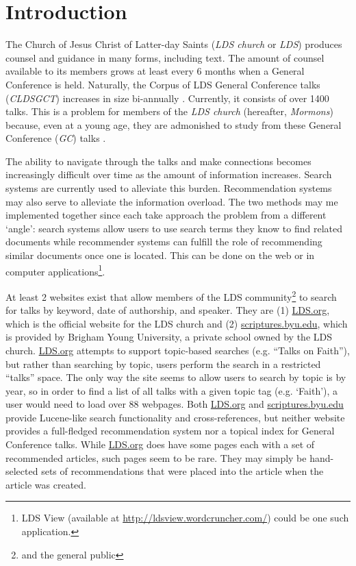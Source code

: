 \chapter{Introduction}

The Church of Jesus Christ of Latter-day Saints (\emph{LDS church} or \emph{LDS}) produces counsel and guidance in many forms, including text. The amount of counsel available to its members grows at least every 6 months when a General Conference is held. Naturally, the Corpus of LDS General Conference talks (\emph{CLDSGCT}) increases in size bi-annually \citep{davies:gc}. Currently, it consists of over 1400 talks. This is a problem for members of the \emph{LDS church} (hereafter, \emph{Mormons}) because, even at a young age, they are admonished to study from these General Conference (\emph{GC}) talks \citep{childrens_songbook}.

The ability to navigate through the talks and make connections becomes increasingly difficult over time as the amount of information increases. Search systems are currently used to alleviate this burden. Recommendation systems may also serve to alleviate the information overload. The two methods may me implemented together since each take approach the problem from a different `angle': search systems allow users to use search terms they know to find related documents while recommender systems can fulfill the role of recommending similar documents once one is located. This can be done on the web or in computer applications\footnote{LDS View (available at \url{http://ldsview.wordcruncher.com/}) could be one such application.}.

At least 2 websites exist that allow members of the LDS community\footnote{and the general public} to search for talks by keyword, date of authorship, and speaker. They are (1) \url{LDS.org}, which is the official website for the LDS church and (2) \url{scriptures.byu.edu}, which is provided by Brigham Young University, a private school owned by the LDS church. \url{LDS.org} attempts to support topic-based searches (e.g. ``Talks on Faith''), but rather than searching by topic, users perform the search in a restricted ``talks'' space. The only way the site seems to allow users to search by topic is by year, so in order to find a list of all talks with a given topic tag (e.g. `Faith'), a user would need to load over 88 webpages. Both \url{LDS.org} and \url{scriptures.byu.edu} provide Lucene-like search functionality \citep{McCandless:2010:LAS:1893016,lucene:luke} and cross-references, but neither website provides a full-fledged recommendation system nor a topical index for General Conference talks. While \url{LDS.org} does have some pages each with a set of recommended articles, such pages seem to be rare. They may simply be hand-selected sets of recommendations that were placed into the article when the article was created.

